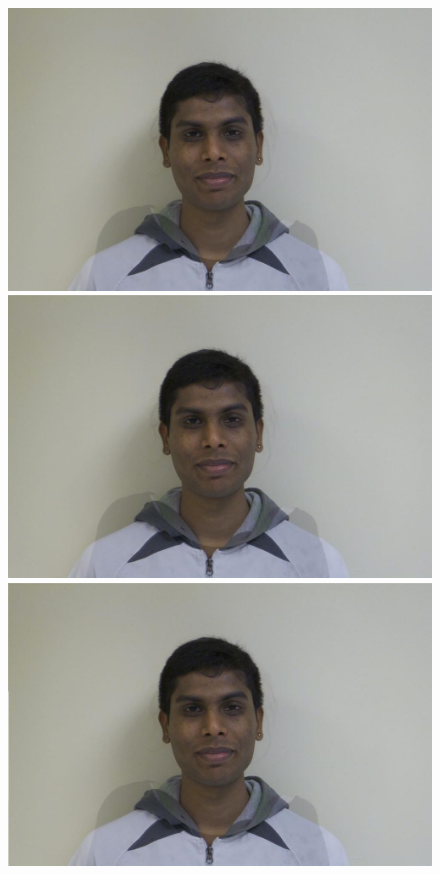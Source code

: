 \documentclass[11pt]{article}
\begin{document}
\begin{figure}[H]
\begin{center}
\includegraphics[scale=0.06]{figs/frames/morph_steinkirch_tangatur_49.jpg} 
\includegraphics[scale=0.06]{figs/frames/morph_steinkirch_tangatur_50.jpg}  
\includegraphics[scale=0.06]{figs/frames/morph_steinkirch_tangatur_51.jpg} 

\end{center}
\end{figure}
\end{document}

